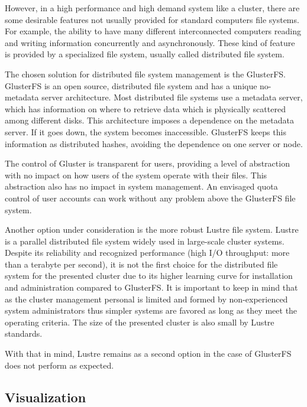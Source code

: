 \documentclass[twoside,a4paper,12pt,english]{inac17}
\begin{document}
However, in a high performance and high demand system like a cluster, there are some desirable features not usually provided for standard computers file systems.
For example, the ability to have many different interconnected computers reading and writing information concurrently and asynchronously. These kind of feature
is provided by a specialized file system, usually called distributed file system\cite{hal}.

The chosen solution for distributed file system management is the GlusterFS\cite{gluster}. GlusterFS is an open source, distributed file system and has
a unique no-metadata server architecture. Most distributed file systems use a metadata server, which has information on where to retrieve data which is
physically scattered among different disks. This architecture imposes a dependence on the metadata server. If it goes down, the system becomes inaccessible.
GlusterFS keeps this information as distributed hashes, avoiding the dependence on one server or node.

The control of Gluster is transparent for users, providing a level of abstraction with no impact on how users of the system operate with their files. This
abstraction also has no impact in system management. An envisaged quota control of user accounts can work without any problem above the GlusterFS file system.

Another option under consideration is the more robust Lustre file system\cite{lustre}. Lustre is a parallel distributed file system widely used in large-scale
cluster systems. Despite its reliability and recognized performance (high I/O throughput: more than a terabyte per second), it is not the first choice
for the distributed file system for the presented cluster due to its higher learning curve for installation and administration compared to GlusterFS.
It is important to keep in mind that as the cluster management personal is limited and formed by non-experienced system
administrators thus simpler systems are favored as long as they meet the operating criteria. The size of the presented cluster is also small by Lustre standards.

With that in mind, Lustre remains as a second option in the case of GlusterFS does not perform as expected. 

\subsection{Visualization}
\end{document}
